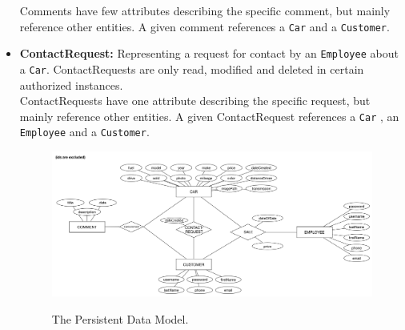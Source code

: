 \begin{itemize}
	Comments have few attributes describing the specific comment, but mainly reference other entities. A given comment references a \texttt{Car} and a \texttt{Customer}.
	\item \textbf{ContactRequest:} Representing a request for contact by an \texttt{Employee} about a \texttt{Car}. ContactRequests are only read, modified and deleted in certain authorized instances.\\
	ContactRequests have one attribute describing the specific request, but mainly reference other entities. A given ContactRequest references a \texttt{Car} , an \texttt{Employee} and a \texttt{Customer}.
	\begin{figure}[H]
		\centering
			\includegraphics[scale=0.30]{Figures/PersistentDataModel}\\
		\caption{The Persistent Data Model.}
	\end{figure}
\end{itemize}